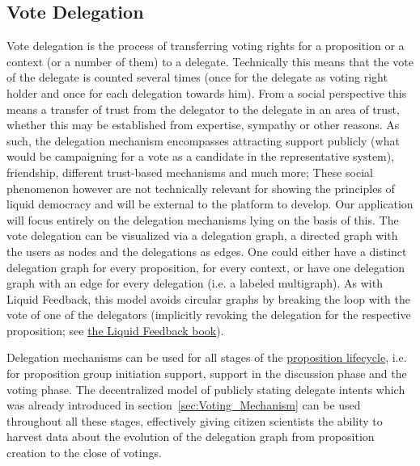 \subsection{Vote Delegation}
\label{sec:Model_VoteDelegation}
Vote delegation is the process of transferring voting rights for a proposition or a context (or a number of them) to a delegate.
Technically this means that the vote of the delegate is counted several times (once for the delegate as voting right holder and once for each delegation towards him).
From a social perspective this means a transfer of trust from the delegator to the delegate in an area of trust, whether this may be established from expertise, sympathy or other reasons.
As such, the delegation mechanism encompasses attracting support publicly (what would be campaigning for a vote as a candidate in the representative system), friendship, different trust-based mechanisms and much more; These social phenomenon however are not technically relevant for showing the principles of liquid democracy and will be external to the platform to develop.
Our application will focus entirely on the delegation mechanisms lying on the basis of this.
The vote delegation can be visualized via a delegation graph, a directed graph with the users as nodes and the delegations as edges.
One could either have a distinct delegation graph for every proposition, for every context, or have one delegation graph with an edge for every delegation (i.e. a labeled multigraph). 
As with Liquid Feedback, this model avoids circular graphs by breaking the loop with the vote of one of the delegators (implicitly revoking the delegation for the respective proposition; see \href{http://principles.liquidfeedback.org/}{the Liquid Feedback book}).

Delegation mechanisms can be used for all stages of the \hyperref[sec:Model_Propositions]{proposition lifecycle}, i.e. for proposition group initiation support, support in the discussion phase and the voting phase.
The decentralized model of publicly stating delegate intents which was already introduced in section~\ref{sec:Voting_Mechanism} can be used throughout all these stages, effectively giving citizen scientists the ability to harvest data about the evolution of the delegation graph from proposition creation to the close of votings.



